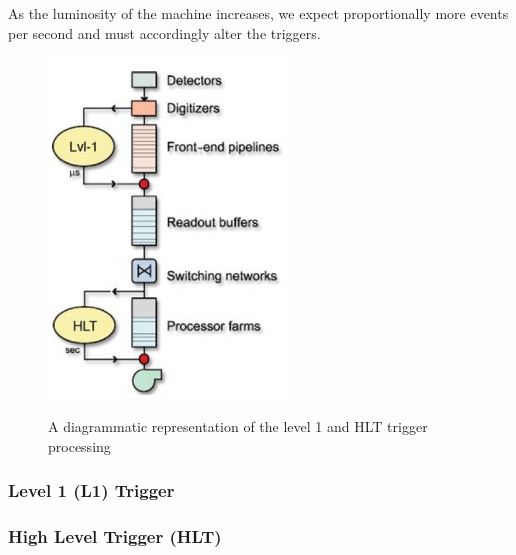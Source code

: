 As the luminosity of the machine increases, we expect proportionally more events per second and must accordingly alter the triggers. 

\begin{figure}
\begin{center}
\includegraphics[width=2.5in]{figures/exp_proj/cms-trigger}\\
\caption{A diagrammatic representation of the level 1 and HLT trigger processing}
\end{center}
\end{figure}


\subsubsection{Level 1 (L1) Trigger}

\subsubsection{High Level Trigger (HLT)}

